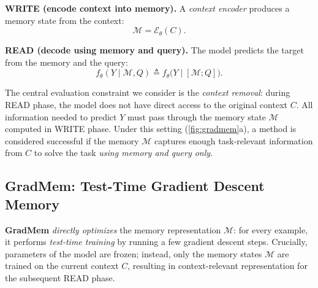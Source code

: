 \documentclass{article}
\theoremstyle{plain}
\theoremstyle{definition}
\theoremstyle{remark}
\begin{document}
\textbf{WRITE (encode context into memory).}
A \emph{context encoder} produces a memory state from the context:
\begin{equation}
\mathcal{M} = \mathcal{E}_\theta(C).
\end{equation}

\textbf{READ (decode using memory and query).}
The model predicts the target from the memory and the query:
\begin{equation}
f_\theta(Y \mid \mathcal{M}, Q) \triangleq f_\theta\bigl(Y \mid [\mathcal{M};Q]\bigr).
\end{equation}

The central evaluation constraint we consider is the \emph{context removal}: during READ phase, the model does not have direct access to the original context $C$.
All information needed to predict $Y$ must pass through the memory state $\mathcal{M}$ computed in WRITE phase. Under this setting (\cref{fig:gradmem}a), a method is considered successful if the memory $\mathcal{M}$ captures enough task-relevant information from $C$ to solve the task \emph{using memory and query only}. 




\subsection{GradMem: Test-Time Gradient Descent Memory}
\label{sec:gradmem}

\textbf{GradMem} \emph{directly optimizes} the memory representation $\mathcal{M}$:
for every example, it performs \emph{test-time training} by running a few gradient descent steps. Crucially, parameters of the model are frozen; instead, only the memory states $\mathcal{M}$ are trained on the current context $C$, resulting in context-relevant representation for the subsequent READ phase.
\end{document}
